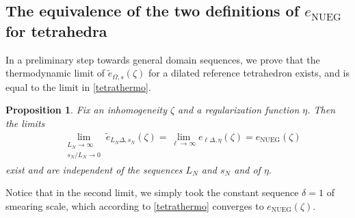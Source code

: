 \documentclass[final,onefignum,onetabnum,reqno]{amsart}
\newtheorem{proposition}[theorem]{Proposition}
\theoremstyle{remark}
\newcommand{\wt}[1]{\widetilde{#1}}
\newcommand{\NUEG}{\mathrm{NUEG}} %
\newcommand{\tetra}{\mathbb{\Delta}} %
\begin{document}
\subsection{The equivalence of the two definitions of $e_\NUEG$ for tetrahedra}
In a preliminary step towards general domain sequences, we prove that the thermodynamic limit of $\wt{e}_{\Omega,s}(\zeta)$ for a dilated reference tetrahedron exists, and is equal to the limit in \cref{tetrathermo}.

\begin{proposition}\label{tetraeq}
Fix an inhomogeneity $\zeta$ and a regularization function $\eta$. Then the limits
\begin{align*}
&\lim_{\substack{L_N\to\infty\\s_N/L_N\to 0}} \wt{e}_{L_N\tetra,s_N}(\zeta)=\lim_{\ell\to\infty} e_{\ell\tetra,\eta}(\zeta)=e_\NUEG(\zeta)
\end{align*}
exist and are independent of the sequences $L_N$ and $s_N$ and of $\eta$.
\end{proposition}
Notice that in the second limit, we simply took the constant sequence $\delta=1$ of smearing scale, which according to \cref{tetrathermo} converges to $e_\NUEG(\zeta)$.
\end{document}
